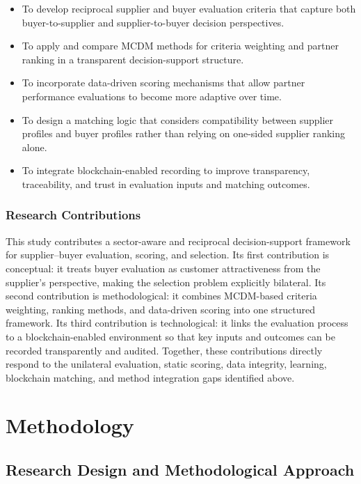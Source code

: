 \documentclass[11pt]{article}
\begin{document}
\begin{itemize}
\item To develop reciprocal supplier and buyer evaluation criteria that capture both buyer-to-supplier and supplier-to-buyer decision perspectives.
\item To apply and compare MCDM methods for criteria weighting and partner ranking in a transparent decision-support structure.
\item To incorporate data-driven scoring mechanisms that allow partner performance evaluations to become more adaptive over time.
\item To design a matching logic that considers compatibility between supplier profiles and buyer profiles rather than relying on one-sided supplier ranking alone.
\item To integrate blockchain-enabled recording to improve transparency, traceability, and trust in evaluation inputs and matching outcomes.
\end{itemize}

\subsubsection{Research Contributions}

This study contributes a sector-aware and reciprocal decision-support framework for supplier--buyer evaluation, scoring, and selection. Its first contribution is conceptual: it treats buyer evaluation as customer attractiveness from the supplier's perspective, making the selection problem explicitly bilateral. Its second contribution is methodological: it combines MCDM-based criteria weighting, ranking methods, and data-driven scoring into one structured framework. Its third contribution is technological: it links the evaluation process to a blockchain-enabled environment so that key inputs and outcomes can be recorded transparently and audited. Together, these contributions directly respond to the unilateral evaluation, static scoring, data integrity, learning, blockchain matching, and method integration gaps identified above.

\newpage
\section{Methodology}

\subsection{Research Design and Methodological Approach}
\end{document}
